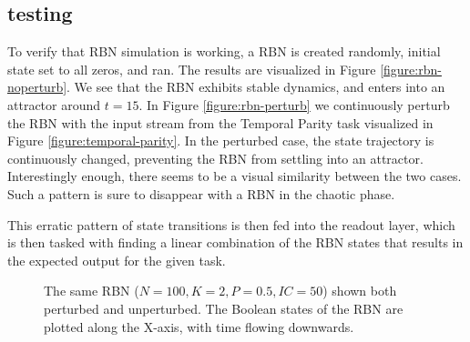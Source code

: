 \subsection{testing}

To verify that RBN simulation is working,
a RBN is created randomly, initial state set to all zeros, and ran.
The results are visualized in Figure \ref{figure:rbn-noperturb}.
We see that the RBN exhibits stable dynamics, and enters into an attractor around $t=15$.
In Figure \ref{figure:rbn-perturb} we continuously perturb the RBN with the input stream from the Temporal Parity task visualized in Figure \ref{figure:temporal-parity}.
In the perturbed case, the state trajectory is continuously changed, preventing the RBN from settling into an attractor.
Interestingly enough, there seems to be a visual similarity between the two cases.
Such a pattern is sure to disappear with a RBN in the chaotic phase.

This erratic pattern of state transitions is then fed into the readout layer,
which is then tasked with finding a linear combination of the RBN states that results in the expected output for the given task.

\begin{figure}
  \caption[Trajectories through state space for perturbed and unperturbed RBNs]{
    The same RBN ($N=100, K=2, P=0.5, IC=50$) shown both perturbed and unperturbed.
    The Boolean states of the RBN are plotted along the X-axis,
    with time flowing downwards.
  }
\end{figure}

